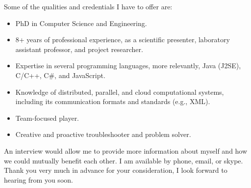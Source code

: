 \documentclass[11pt, a4paper]{awesome-cv}
\begin{document}
\begin{cvletter}
Some of the qualities and credentials I have to offer are:
\begin{itemize}
	\item PhD in Computer Science and Engineering.
	\item 8+ years of professional experience, as a scientific presenter, laboratory assistant professor, and project researcher.
	\item Expertise in several programming languages, more relevantly, Java (J2SE), C/C++, C\#, and JavaScript.
	\item Knowledge of distributed, parallel, and cloud computational systems, including its communication formats and standards (e.g., XML).
	\item Team-focused player.	
	\item Creative and proactive troubleshooter and problem solver.
\end{itemize}



An interview would allow me to provide more information about myself and how we could mutually benefit each other.
I am available by phone, email, or skype.
Thank you very much in advance for your consideration, I look forward to hearing from you soon.

\end{cvletter}


\makeletterclosing
\end{document}
